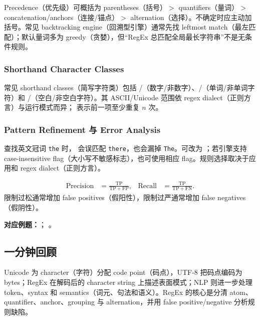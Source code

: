 Precedence（优先级）可概括为 parentheses（括号）$>$ quantifiers（量词）$>$ concatenation/anchors（连接/锚点）$>$ alternation（选择）。不确定时应主动加括号。常见 backtracking engine（回溯型引擎）通常先找 leftmost match（最左匹配）；默认量词多为 greedy（贪婪），但“RegEx 总匹配全局最长字符串”不是无条件规则。

\subsubsection{Shorthand Character Classes}

常见 shorthand classes（简写字符类）包括 \texttt{\detokenize{\d}}/\texttt{\detokenize{\D}}（数字/非数字）、\texttt{\detokenize{\w}}/\texttt{\detokenize{\W}}（单词/非单词字符）和 \texttt{\detokenize{\s}}/\texttt{\detokenize{\S}}（空白/非空白字符）。其 ASCII/Unicode 范围依 regex dialect（正则方言）与运行模式而异；\texttt{} 表示前一项至少重复 $n$ 次。

\subsubsection{Pattern Refinement 与 Error Analysis}

查找英文冠词 \texttt{the} 时，\texttt{} 会误匹配 \texttt{there}，也会漏掉 \texttt{The}。可改为 \texttt{}；若引擎支持 case-insensitive flag（大小写不敏感标志），也可使用相应 flag。规则选择取决于应用和 regex dialect（正则方言）。

\begin{align*}
  \mathrm{Precision} &= \frac{\mathrm{TP}}{\mathrm{TP}+\mathrm{FP}}, &
  \mathrm{Recall} &= \frac{\mathrm{TP}}{\mathrm{TP}+\mathrm{FN}}.
\end{align*}
限制过松通常增加 false positives（假阳性），限制过严通常增加 false negatives（假阴性）。

\textbf{对应例题：}；
。

\subsection{一分钟回顾}

Unicode 为 character（字符）分配 code point（码点），UTF-8 把码点编码为 bytes；RegEx 在解码后的 character string 上描述表面模式；NLP 则进一步处理 token、syntax 和 semantics（词元、句法和语义）。RegEx 的核心是分清 atom、quantifier、anchor、grouping 与 alternation，并用 false positive/negative 分析规则缺陷。
